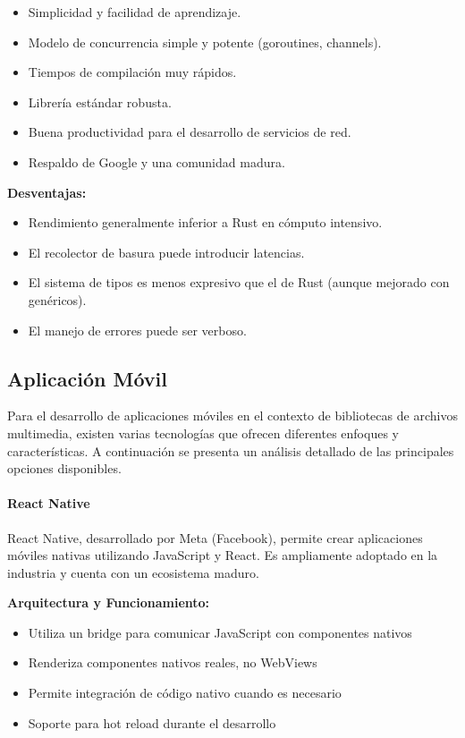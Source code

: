 \begin{itemize}
    \item Simplicidad y facilidad de aprendizaje.
    \item Modelo de concurrencia simple y potente (goroutines, channels).
    \item Tiempos de compilación muy rápidos.
    \item Librería estándar robusta.
    \item Buena productividad para el desarrollo de servicios de red.
    \item Respaldo de Google y una comunidad madura.
\end{itemize}
\textbf{Desventajas:}
\begin{itemize}
    \item Rendimiento generalmente inferior a Rust en cómputo intensivo.
    \item El recolector de basura puede introducir latencias.
    \item El sistema de tipos es menos expresivo que el de Rust (aunque mejorado con genéricos).
    \item El manejo de errores puede ser verboso.
\end{itemize}


\subsection{Aplicación Móvil}

Para el desarrollo de aplicaciones móviles en el contexto de bibliotecas de archivos multimedia, existen varias tecnologías que ofrecen diferentes enfoques y características. A continuación se presenta un análisis detallado de las principales opciones disponibles.

\paragraph{React Native}

React Native, desarrollado por Meta (Facebook), permite crear aplicaciones móviles nativas utilizando JavaScript y React. Es ampliamente adoptado en la industria y cuenta con un ecosistema maduro.

\textbf{Arquitectura y Funcionamiento:}
\begin{itemize}
    \item Utiliza un \gls{bridge} para comunicar JavaScript con componentes nativos
    \item Renderiza componentes nativos reales, no WebViews
    \item Permite integración de código nativo cuando es necesario
    \item Soporte para hot reload durante el desarrollo
\end{itemize}

